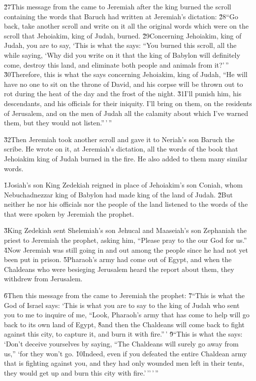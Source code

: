 \v{27}This message from the  came to Jeremiah after the king burned the scroll containing the words that Baruch had written at Jeremiah's dictation: \v{28}``Go back, take another scroll and write on it all the original words which were on the scroll that Jehoiakim, king of Judah, burned. \v{29}Concerning Jehoiakim, king of Judah, you are to say, `This is what the  says: ``You burned this scroll, all the while saying, `Why did you write on it that the king of Babylon will definitely come, destroy this land, and eliminate both people and animals from it?'\,'' \v{30}Therefore, this is what the  says concerning Jehoiakim, king of Judah, ``He will have no one to sit on the throne of David, and his corpse will be thrown out to rot during the heat of the day and the frost of the night. \v{31}I'll punish him, his descendants, and his officials for their iniquity. I'll bring on them, on the residents of Jerusalem, and on the men of Judah all the calamity about which I've warned them, but they would not listen.''\,'\,''

\v{32}Then Jeremiah took another scroll and gave it to Neriah's son Baruch the scribe. He wrote on it, at Jeremiah's dictation, all the words of the book that Jehoiakim king of Judah burned in the fire. He also added to them many similar words.

\v{1}Josiah's son King Zedekiah reigned in place of Jehoiakim's son Coniah, whom Nebuchadnezzar king of Babylon had made king of the land of Judah. \v{2}But neither he nor his officials nor the people of the land listened to the words of the  that were spoken by Jeremiah the prophet.

\v{3}King Zedekiah sent Shelemiah's son Jehucal and Maaseiah's son Zephaniah the priest to Jeremiah the prophet, asking him, ``Please pray to the  our God for us.'' \v{4}Now Jeremiah was still going in and out among the people since he had not yet been put in prison. \v{5}Pharaoh's army had come out of Egypt, and when the Chaldeans who were besieging Jerusalem heard the report about them, they withdrew from Jerusalem.

\v{6}Then this message from the  came to Jeremiah the prophet: \v{7}``This is what the  God of Israel says: `This is what you are to say to the king of Judah who sent you to me to inquire of me, ``Look, Pharaoh's army that has come to help will go back to its own land of Egypt, \v{8}and then the Chaldeans will come back to fight against this city, to capture it, and burn it with fire.''\,' \v{9}``This is what the  says: `Don't deceive yourselves by saying, ``The Chaldeans will surely go away from us,'' `for they won't go. \v{10}Indeed, even if you defeated the entire Chaldean army that is fighting against you, and they had only wounded men left in their tents, they would get up and burn this city with fire.'\,''\,'\,''

